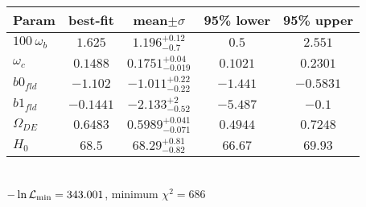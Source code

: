 \begin{tabular}{|l|c|c|c|c|} 
 \hline 
Param & best-fit & mean$\pm\sigma$ & 95\% lower & 95\% upper \\ \hline 
$100~\omega_{b }$ &$1.625$ & $1.196_{-0.7}^{+0.12}$ & $0.5$ & $2.551$ \\ 
$\omega_c$ &$0.1488$ & $0.1751_{-0.019}^{+0.04}$ & $0.1021$ & $0.2301$ \\ 
$b0_{fld }$ &$-1.102$ & $-1.011_{-0.22}^{+0.22}$ & $-1.441$ & $-0.5831$ \\ 
$b1_{fld }$ &$-0.1441$ & $-2.133_{-0.52}^{+2}$ & $-5.487$ & $-0.1$ \\ 
$\Omega_{DE}$ &$0.6483$ & $0.5989_{-0.071}^{+0.041}$ & $0.4944$ & $0.7248$ \\ 
$H_{0 }$ &$68.5$ & $68.29_{-0.82}^{+0.81}$ & $66.67$ & $69.93$ \\ 
\hline 
 \end{tabular} \\ 
$-\ln{\cal L}_\mathrm{min} =343.001$, minimum $\chi^2=686$ \\ 
